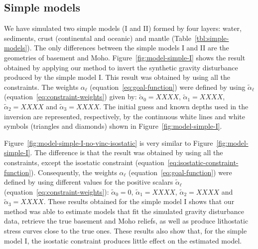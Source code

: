 \documentclass[manuscript]{geophysics}
\begin{document}
\subsection{Simple models}

We have simulated two simple models (I and II) formed by four layers: water, sediments,
crust (continental and oceanic) and mantle (Table~\ref{tbl:simple-models}).
The only differences between the simple models I and II are the geometries of basement
and Moho.
Figure~\ref{fig:model-simple-I} shows the result obtained by applying our method
to invert the synthetic gravity disturbance produced by the simple model I.
This result was obtained by using all the constraints.
The weights $\alpha_{\ell}$ (equation~\ref{eq:goal-function}) were defined
by using $\tilde{\alpha}_{\ell}$ (equation~\ref{eq:constraint-weights}) given by: 
$\tilde{\alpha}_{0} = XXXX$, $\tilde{\alpha}_{1} = XXXX$, 
$\tilde{\alpha}_{2} = XXXX$ and $\tilde{\alpha}_{3} = XXXX$.
The initial guess and known depths used 
in the inversion are represented, respectively, by the continuous white lines and 
white symbols (triangles and diamonds) shown in Figure~\ref{fig:model-simple-I}.

Figure~\ref{fig:model-simple-I-no-vinc-isostatic} is very similar to
Figure~\ref{fig:model-simple-I}. The difference is that the result was
obtained by using all the constraints, except the isostatic constraint
(equation~\ref{eq:isostatic-constraint-function}). Consequently,
the weights $\alpha_{\ell}$ (equation~\ref{eq:goal-function}) were defined
by using different values for the positive scalars $\tilde{\alpha}_{\ell}$ 
(equation~\ref{eq:constraint-weights}): 
$\tilde{\alpha}_{0} = 0$, $\tilde{\alpha}_{1} = XXXX$, 
$\tilde{\alpha}_{2} = XXXX$ and $\tilde{\alpha}_{3} = XXXX$.
These results obtained for the simple model I shows that our method
was able to estimate models that fit the simulated gravity disturbance data, 
retrieve the true basement and Moho reliefs, as well as 
produce lithostatic stress curves close to the true ones.
These results also show that, for the simple model I, the isostatic constraint 
produces little effect on the estimated model. 
\end{document}
